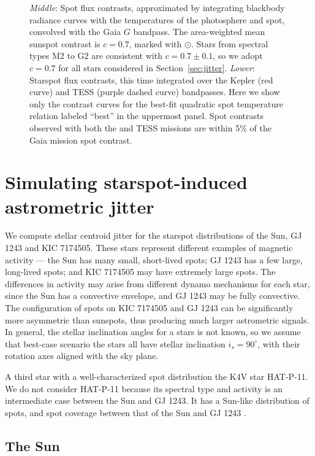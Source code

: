 \begin{figure}
{{\sl Middle}: Spot flux contrasts, approximated by integrating blackbody radiance curves with the temperatures of the photosphere and spot, convolved with the Gaia $G$ bandpass. The area-weighted mean sunspot contrast is $c=0.7$, marked with $\odot$. Stars from spectral types M2 to G2 are consistent with $c=0.7\pm0.1$, so we adopt $c=0.7$ for all stars considered in Section~\ref{sec:jitter}.
{\sl Lower}: Starspot flux contrasts, this time integrated over the Kepler (red curve) and TESS (purple dashed curve) bandpasses. Here we show only the contrast curves for the best-fit quadratic spot temperature relation labeled ``best'' in the uppermost panel. Spot contrasts observed with both the \kepler and TESS missions are within 5\% of the Gaia mission spot contrast.
\label{fig:contrast}}
\end{figure}

\section{Simulating starspot-induced astrometric jitter} \label{sec:sim}

We compute stellar centroid jitter for the starspot distributions of the Sun, GJ 1243 and KIC 7174505. These stars represent different examples of magnetic activity --- the Sun has many small, short-lived spots; GJ 1243 has a few large, long-lived spots; and KIC 7174505 may have extremely large spots. The differences in activity may arise from different dynamo mechanisms for each star, since the Sun has a convective envelope, and GJ 1243 may be fully convective. The configuration of spots on KIC 7174505 and GJ 1243 can be significantly more asymmetric than sunspots, thus producing much larger astrometric signals. In general, the stellar inclination angles for a stars is not known, so we assume that best-case scenario the stars all have stellar inclination $i_s = 90^\circ$, with their rotation axes aligned with the sky plane.

A third star with a well-characterized spot distribution the K4V star HAT-P-11. We do not consider HAT-P-11 because its spectral type and activity is an intermediate case between the Sun and GJ 1243. It has a Sun-like distribution of spots, and spot coverage between that of the Sun and GJ 1243 \citep{Morris2017a, Morris2017b, Davenport2015}. 

\subsection{The Sun} \label{sec:sun}

